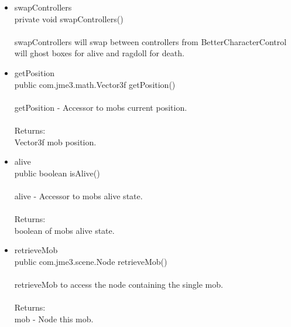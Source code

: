 \documentclass[letterpaper]{article}
\begin{document}
\begin{itemize}
\begin{itemize}
													\item	swapControllers \\
															private void swapControllers() \\ \\
															swapControllers will swap between controllers from BetterCharacterControl will ghost boxes for alive and ragdoll for death. \\
													\item	getPosition \\
															public com.jme3.math.Vector3f getPosition() \\ \\
															getPosition - Accessor to mobs current position. \\ \\
															Returns: \\
															Vector3f mob position.
													\item	alive \\
															public boolean isAlive() \\ \\
															alive - Accessor to mobs alive state. \\ \\
															Returns: \\
															boolean of mobs alive state. \\
													\item	retrieveMob \\
															public com.jme3.scene.Node retrieveMob() \\ \\
															retrieveMob to access the node containing the single mob. \\ \\
															Returns: \\
															mob - Node this mob.
												\end{itemize}
									\end{itemize}
									
								\vspace{0.2in}
\end{document}
